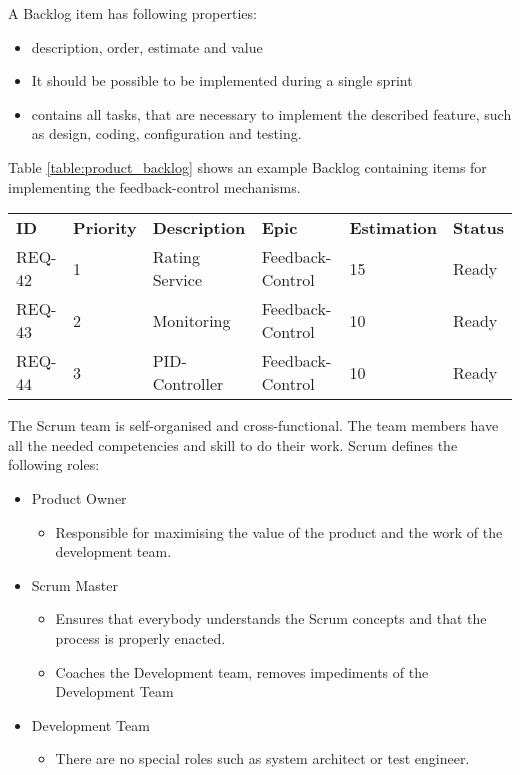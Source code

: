 A Backlog item has following properties:
\begin{itemize}
	\item description, order, estimate and value
	\item It should be possible to be implemented during a single sprint 
	\item contains all tasks, that are necessary to implement the described feature, such as design, coding, configuration and testing.
\end{itemize}

Table \ref{table:product_backlog} shows an example Backlog containing items for implementing the feedback-control mechanisms.

\begin{landscape}
	\begin{tabularx}{\columnwidth}{@{} l X X X X X @{}}
		\caption{Example Product Backlog} \label{table:product_backlog}\\
		\toprule
		\bfseries ID & \bfseries Priority & \bfseries Description & \bfseries Epic & \bfseries Estimation & \bfseries Status \\
		REQ-42 & 1 & Rating Service & Feedback-Control & 15 & Ready\\
		REQ-43 & 2 & Monitoring & Feedback-Control & 10 & Ready\\
		REQ-44 & 3 & PID-Controller & Feedback-Control & 10 & Ready\\
		\bottomrule
	\end{tabularx}
\end{landscape}

The Scrum team is self-organised and cross-functional. The team members have all the needed competencies and skill to do their work.
Scrum defines the following roles:
\begin{itemize}
	\item Product Owner
	\begin{itemize}
		\item Responsible for maximising the value of the product and the work of the development team.
	\end{itemize}
	\item Scrum Master
	\begin{itemize}
		\item Ensures that everybody understands the Scrum concepts and that the process is properly enacted.
		\item Coaches the Development team, removes impediments of the Development Team
	\end{itemize}
	\item Development Team
	\begin{itemize}
		\item There are no special roles such as system architect or test engineer.
	\end{itemize}
\end{itemize}

